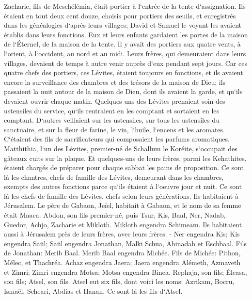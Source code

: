 \verse Zacharie, fils de Meschélémia, était portier à l`entrée de la tente d`assignation. 
\verse Ils étaient en tout deux cent douze, choisis pour portiers des seuils, et enregistrés dans les généalogies d`après leurs villages; David et Samuel le voyant les avaient établis dans leurs fonctions. 
\verse Eux et leurs enfants gardaient les portes de la maison de l`Éternel, de la maison de la tente. 
\verse Il y avait des portiers aux quatre vents, à l`orient, à l`occident, au nord et au midi. 
\verse Leurs frères, qui demeuraient dans leurs villages, devaient de temps à autre venir auprès d`eux pendant sept jours. 
\verse Car ces quatre chefs des portiers, ces Lévites, étaient toujours en fonctions, et ils avaient encore la surveillance des chambres et des trésors de la maison de Dieu; 
\verse ils passaient la nuit autour de la maison de Dieu, dont ils avaient la garde, et qu`ils devaient ouvrir chaque matin. 
\verse Quelques-uns des Lévites prenaient soin des ustensiles du service, qu`ils rentraient en les comptant et sortaient en les comptant. 
\verse D`autres veillaient sur les ustensiles, sur tous les ustensiles du sanctuaire, et sur la fleur de farine, le vin, l`huile, l`encens et les aromates. 
\verse C`étaient des fils de sacrificateurs qui composaient les parfums aromatiques. 
\verse Matthithia, l`un des Lévites, premier-né de Schallum le Koréite, s`occupait des gâteaux cuits sur la plaque. 
\verse Et quelques-uns de leurs frères, parmi les Kehathites, étaient chargés de préparer pour chaque sabbat les pains de proposition. 
\verse Ce sont là les chantres, chefs de famille des Lévites, demeurant dans les chambres, exempts des autres fonctions parce qu`ils étaient à l`oeuvre jour et nuit. 
\verse Ce sont là les chefs de famille des Lévites, chefs selon leurs générations. Ils habitaient à Jérusalem. 
\verse Le père de Gabaon, Jeïel, habitait à Gabaon, et le nom de sa femme était Maaca. 
\verse Abdon, son fils premier-né, puis Tsur, Kis, Baal, Ner, Nadab, 
\verse Guedor, Achjo, Zacharie et Mikloth. 
\verse Mikloth engendra Schimeam. Ils habitaient aussi à Jérusalem près de leurs frères, avec leurs frères. - 
\verse Ner engendra Kis; Kis engendra Saül; Saül engendra Jonathan, Malki Schua, Abinadab et Eschbaal. 
\verse Fils de Jonathan: Merib Baal. Merib Baal engendra Michée. 
\verse Fils de Michée: Pithon, Mélec, et Thachréa. 
\verse Achaz engendra Jaera; Jaera engendra Alémeth, Azmaveth et Zimri; Zimri engendra Motsa; Motsa engendra Binea. 
\verse Rephaja, son fils; Éleasa, son fils; Atsel, son fils. 
\verse Atsel eut six fils, dont voici les noms: Azrikam, Bocru, Ismaël, Scheari, Abdias et Hanan. Ce sont là les fils d`Atsel. 

